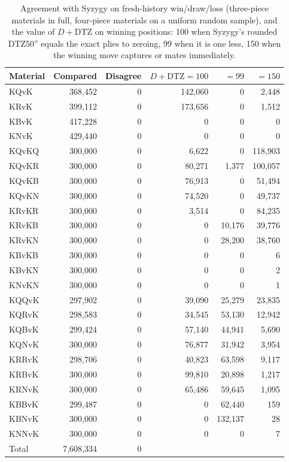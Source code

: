 \begin{table}[t]\centering\small
\caption{Agreement with Syzygy on fresh-history win/draw/loss (three-piece materials in full, four-piece materials on a uniform random sample), and the value of $D+\mathrm{DTZ}$ on winning positions: 100 when Syzygy's rounded DTZ50'' equals the exact plies to zeroing, 99 when it is one less, 150 when the winning move captures or mates immediately.}
\label{tab:syzygy}
\begin{tabular}{@{}lrrrrr@{}}\toprule
Material & Compared & Disagree & $D{+}\mathrm{DTZ}{=}100$ & ${=}99$ & ${=}150$\\ \midrule
KQvK & 368{,}452 & 0 & 142{,}060 & 0 & 2{,}448\\
KRvK & 399{,}112 & 0 & 173{,}656 & 0 & 1{,}512\\
KBvK & 417{,}228 & 0 & 0 & 0 & 0\\
KNvK & 429{,}440 & 0 & 0 & 0 & 0\\
KQvKQ & 300{,}000 & 0 & 6{,}622 & 0 & 118{,}903\\
KQvKR & 300{,}000 & 0 & 80{,}271 & 1{,}377 & 100{,}057\\
KQvKB & 300{,}000 & 0 & 76{,}913 & 0 & 51{,}494\\
KQvKN & 300{,}000 & 0 & 74{,}520 & 0 & 49{,}737\\
KRvKR & 300{,}000 & 0 & 3{,}514 & 0 & 84{,}235\\
KRvKB & 300{,}000 & 0 & 0 & 10{,}176 & 39{,}776\\
KRvKN & 300{,}000 & 0 & 0 & 28{,}200 & 38{,}760\\
KBvKB & 300{,}000 & 0 & 0 & 0 & 6\\
KBvKN & 300{,}000 & 0 & 0 & 0 & 2\\
KNvKN & 300{,}000 & 0 & 0 & 0 & 1\\
KQQvK & 297{,}902 & 0 & 39{,}090 & 25{,}279 & 23{,}835\\
KQRvK & 298{,}583 & 0 & 34{,}545 & 53{,}130 & 12{,}942\\
KQBvK & 299{,}424 & 0 & 57{,}140 & 44{,}941 & 5{,}690\\
KQNvK & 300{,}000 & 0 & 76{,}877 & 31{,}942 & 3{,}954\\
KRRvK & 298{,}706 & 0 & 40{,}823 & 63{,}598 & 9{,}117\\
KRBvK & 300{,}000 & 0 & 99{,}810 & 20{,}898 & 1{,}217\\
KRNvK & 300{,}000 & 0 & 65{,}486 & 59{,}645 & 1{,}095\\
KBBvK & 299{,}487 & 0 & 0 & 62{,}440 & 159\\
KBNvK & 300{,}000 & 0 & 0 & 132{,}137 & 28\\
KNNvK & 300{,}000 & 0 & 0 & 0 & 7\\
\midrule
Total & 7{,}608{,}334 & 0 & & & \\
\bottomrule
\end{tabular}
\end{table}
